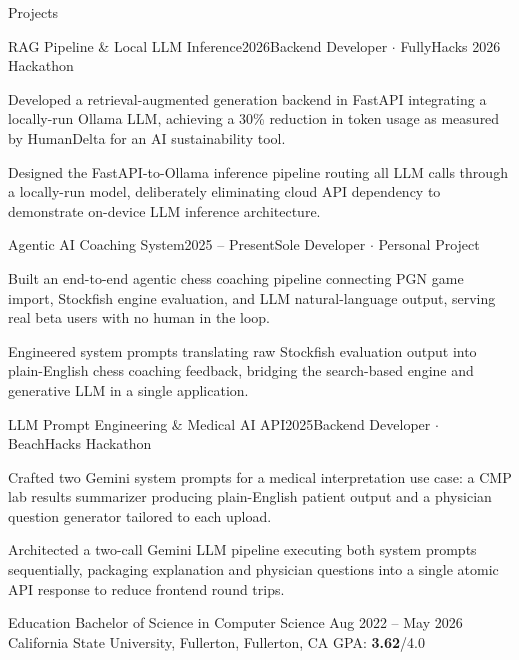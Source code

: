 \documentclass{resume}
\begin{document}
\begin{rSection}{Projects}

\begin{rSubsection}{RAG Pipeline \& Local LLM Inference}{\textcolor{black!60}{2026}}{Backend Developer $\cdot$ FullyHacks 2026 Hackathon}{}
\item Developed a retrieval-augmented generation backend in FastAPI integrating a locally-run Ollama LLM, achieving a 30\% reduction in token usage as measured by HumanDelta for an AI sustainability tool.
\item Designed the FastAPI-to-Ollama inference pipeline routing all LLM calls through a locally-run model, deliberately eliminating cloud API dependency to demonstrate on-device LLM inference architecture.
\end{rSubsection}

\begin{rSubsection}{Agentic AI Coaching System}{\textcolor{black!60}{2025 -- Present}}{Sole Developer $\cdot$ Personal Project}{}
\item Built an end-to-end agentic chess coaching pipeline connecting PGN game import, Stockfish engine evaluation, and LLM natural-language output, serving real beta users with no human in the loop.
\item Engineered system prompts translating raw Stockfish evaluation output into plain-English chess coaching feedback, bridging the search-based engine and generative LLM in a single application.
\end{rSubsection}

\begin{rSubsection}{LLM Prompt Engineering \& Medical AI API}{\textcolor{black!60}{2025}}{Backend Developer $\cdot$ BeachHacks Hackathon}{}
\item Crafted two Gemini system prompts for a medical interpretation use case: a CMP lab results summarizer producing plain-English patient output and a physician question generator tailored to each upload.
\item Architected a two-call Gemini LLM pipeline executing both system prompts sequentially, packaging explanation and physician questions into a single atomic API response to reduce frontend round trips.
\end{rSubsection}

\end{rSection}
\vspace{-0.15cm}

\begin{rSection}{Education}
{Bachelor of Science in Computer Science} \hfill {\textcolor{black!60}{Aug 2022 -- May 2026}}\\
{California State University, Fullerton}, Fullerton, CA \hfill GPA: \textbf{3.62}/4.0
\end{rSection}
\end{document}
